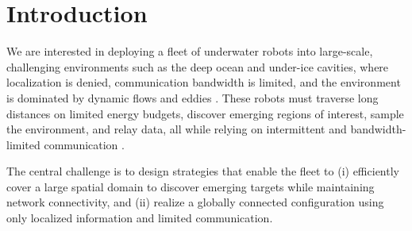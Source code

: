 \documentclass[conference]{IEEEconf}
\theoremstyle{plain}
\begin{document}

\section{Introduction}

We are interested in deploying a fleet of underwater robots into large-scale, challenging environments such as the deep ocean and under-ice cavities, where localization is denied, communication bandwidth is limited, and the environment is dominated by dynamic flows and eddies \cite{muto2024}. 
These robots must traverse long distances on limited energy budgets, discover emerging regions of interest, sample the environment, and relay data, all while relying on intermittent and bandwidth-limited communication \cite{schiel2024chirps, schiel2024role}.

The central challenge is to design strategies that enable the fleet to (i) efficiently cover a large spatial domain to discover emerging targets while maintaining network connectivity, and (ii) realize a globally connected configuration using only localized information and limited communication.


\end{document}

